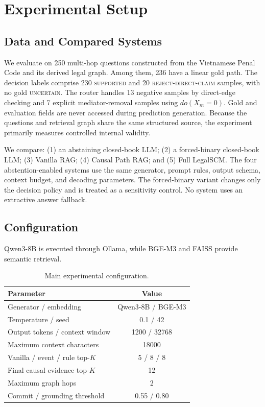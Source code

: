 \section{Experimental Setup}
\label{sec:experimental_setup}

\subsection{Data and Compared Systems}

We evaluate on 250 multi-hop questions constructed from the Vietnamese Penal
Code \cite{blhs2025} and its derived legal graph. Among them, 236 have a linear
gold path. The decision labels comprise 230 \textsc{supported} and 20
\textsc{reject-direct-claim} samples, with no gold \textsc{uncertain}. The
router handles 13 negative samples by direct-edge checking and 7 explicit
mediator-removal samples using $do(X_m=0)$. Gold and evaluation fields are
never accessed during prediction generation. Because the questions and
retrieval graph share the same structured source, the experiment primarily
measures controlled internal validity.

We compare: (1) an abstaining closed-book LLM; (2) a forced-binary closed-book
LLM; (3) Vanilla RAG; (4) Causal Path RAG; and (5) Full LegalSCM. The four
abstention-enabled systems use the same generator, prompt rules, output schema,
context budget, and decoding parameters. The forced-binary variant changes
only the decision policy and is treated as a sensitivity control. No system
uses an extractive answer fallback.

\subsection{Configuration}

Qwen3-8B is executed through Ollama, while BGE-M3
\cite{chen2024bgem3} and FAISS provide semantic retrieval.

\begin{table}[t]
\centering
\caption{Main experimental configuration.}
\label{tab:experimental_config}
\small
\begin{tabular}{lc}
\hline
\textbf{Parameter} & \textbf{Value}\\
\hline
Generator / embedding & Qwen3-8B / BGE-M3\\
Temperature / seed & 0.1 / 42\\
Output tokens / context window & 1200 / 32768\\
Maximum context characters & 18000\\
Vanilla / event / rule top-$K$ & 5 / 8 / 8\\
Final causal evidence top-$K$ & 12\\
Maximum graph hops & 2\\
Commit / grounding threshold & 0.55 / 0.80\\
\hline
\end{tabular}
\end{table}

